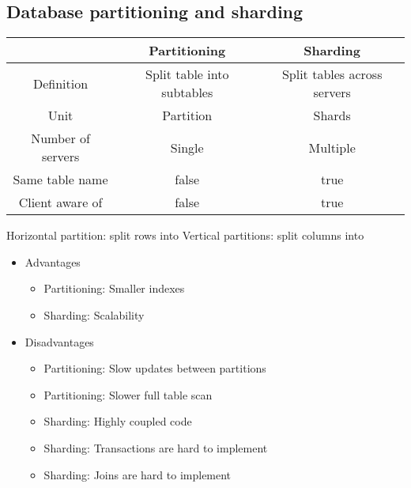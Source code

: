 \documentclass[../../main.tex]{subfiles}
\begin{document}
\subsection{Database partitioning and sharding}
\begin{center}
    \begin{tabular}{ |c|c|c| }
    \hline
    & Partitioning & Sharding \\
    \hline
    \hline
    Definition & Split table into subtables & Split tables across servers \\
    \hline
    Unit & Partition & Shards \\
    \hline
    Number of servers & Single & Multiple \\
    \hline
    Same table name & false & true \\
    \hline
    Client aware of & false & true \\
    \hline
    \end{tabular}
\end{center}
Horizontal partition: split rows into
Vertical partitions: split columns into

\begin{itemize}
    \item Advantages
    \begin{itemize}
        \item Partitioning: Smaller indexes
        \item Sharding: Scalability
    \end{itemize}
    \item Disadvantages
    \begin{itemize}
        \item Partitioning: Slow updates between partitions
        \item Partitioning: Slower full table scan
        \item Sharding: Highly coupled code
        \item Sharding: Transactions are hard to implement
        \item Sharding: Joins are hard to implement
    \end{itemize}
\end{itemize}
\end{document}
